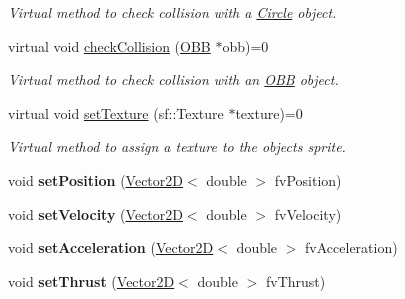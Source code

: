 \begin{DoxyCompactItemize}
\begin{DoxyCompactList}\small\item\em Virtual method to check collision with a \hyperlink{class_circle}{Circle} object. \end{DoxyCompactList}\item 
\hypertarget{class_collidable_a90789947098d0f6f43e3ef8a944a5657}{}virtual void \hyperlink{class_collidable_a90789947098d0f6f43e3ef8a944a5657}{check\+Collision} (\hyperlink{class_o_b_b}{O\+B\+B} $\ast$obb)=0\label{class_collidable_a90789947098d0f6f43e3ef8a944a5657}

\begin{DoxyCompactList}\small\item\em Virtual method to check collision with an \hyperlink{class_o_b_b}{O\+B\+B} object. \end{DoxyCompactList}\item 
\hypertarget{class_collidable_ab591b36248e5178a6e3a430d3eb67144}{}virtual void \hyperlink{class_collidable_ab591b36248e5178a6e3a430d3eb67144}{set\+Texture} (sf\+::\+Texture $\ast$texture)=0\label{class_collidable_ab591b36248e5178a6e3a430d3eb67144}

\begin{DoxyCompactList}\small\item\em Virtual method to assign a texture to the object\textquotesingle{}s sprite. \end{DoxyCompactList}\item 
\hypertarget{class_collidable_ae32eb0a55753347190758d00e403c7e8}{}void {\bfseries set\+Position} (\hyperlink{class_vector2_d}{Vector2\+D}$<$ double $>$ fv\+Position)\label{class_collidable_ae32eb0a55753347190758d00e403c7e8}

\item 
\hypertarget{class_collidable_af6355717261e9475643232f31ec46424}{}void {\bfseries set\+Velocity} (\hyperlink{class_vector2_d}{Vector2\+D}$<$ double $>$ fv\+Velocity)\label{class_collidable_af6355717261e9475643232f31ec46424}

\item 
\hypertarget{class_collidable_a669e3a62211f10242fdd9d18ed160356}{}void {\bfseries set\+Acceleration} (\hyperlink{class_vector2_d}{Vector2\+D}$<$ double $>$ fv\+Acceleration)\label{class_collidable_a669e3a62211f10242fdd9d18ed160356}

\item 
\hypertarget{class_collidable_a2fa1b52be385f9ff2cf08670a9606cc1}{}void {\bfseries set\+Thrust} (\hyperlink{class_vector2_d}{Vector2\+D}$<$ double $>$ fv\+Thrust)\label{class_collidable_a2fa1b52be385f9ff2cf08670a9606cc1}


\end{DoxyCompactItemize}
